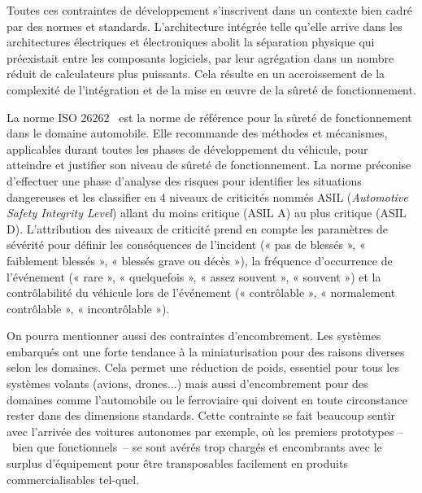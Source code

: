 \documentclass[french, a4paper, 11pt, twoside, pdftex]{StyleThese}
\begin{document}
		Toutes ces contraintes de développement s'inscrivent dans un contexte bien cadré par des normes et standards. L’architecture intégrée telle qu'elle arrive dans les architectures électriques et électroniques abolit la séparation physique qui préexistait entre les composants logiciels, par leur agrégation dans un nombre réduit de calculateurs plus puissants. Cela résulte en un accroissement de la complexité de l’intégration et de la mise en œuvre de la sûreté de fonctionnement. 
		

		
		La norme ISO 26262~\cite{iso_26262-10_road_2018} est la norme de référence pour la sûreté de fonctionnement dans le domaine automobile. Elle recommande des méthodes et mécanismes, applicables durant toutes les phases de développement du véhicule, pour atteindre et justifier son niveau de sûreté de fonctionnement. La norme préconise d’effectuer une phase d’analyse des risques pour identifier les situations dangereuses et les classifier en 4 niveaux de criticités nommés ASIL (\textit{Automotive Safety Integrity Level}) allant du moins critique (ASIL A) au plus critique (ASIL D). L’attribution des niveaux de criticité prend en compte les paramètres de sévérité pour définir les conséquences de l’incident (« pas de blessés », « faiblement blessés », « blessés grave ou décès »), la fréquence d’occurrence de l’événement (« rare », « quelquefois », « assez souvent », « souvent ») et la contrôlabilité du véhicule lors de l’événement (« contrôlable », « normalement contrôlable », « incontrôlable »).

		
		On pourra mentionner aussi des contraintes d'encombrement. Les systèmes embarqués ont une forte tendance à la miniaturisation pour des raisons diverses selon les domaines. Cela permet une réduction de poids, essentiel pour tous les systèmes volants (avions, drones...) mais aussi d'encombrement pour des domaines comme l'automobile ou le ferroviaire qui doivent en toute circonstance rester dans des dimensions standards. Cette contrainte se fait beaucoup sentir avec l'arrivée des voitures autonomes par exemple, où les premiers prototypes --~bien que fonctionnels~-- se sont avérés trop chargés et encombrants avec le surplus d'équipement pour être transposables facilement en produits commercialisables tel-quel.
		
\end{document}

